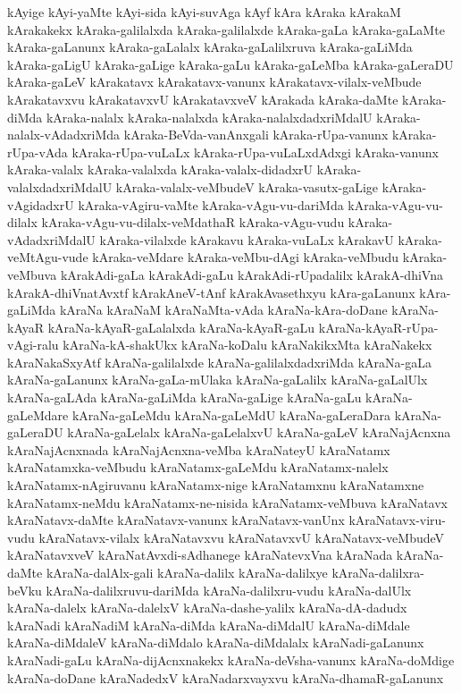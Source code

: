 {kAyige
kAyi-yaMte
kAyi-sida
kAyi-suvAga
kAyf
kAra
kAraka
kArakaM
kArakakekx
kAraka-galilalxda
kAraka-galilalxde
kAraka-gaLa
kAraka-gaLaMte
kAraka-gaLanunx
kAraka-gaLalalx
kAraka-gaLalilxruva
kAraka-gaLiMda
kAraka-gaLigU
kAraka-gaLige
kAraka-gaLu
kAraka-gaLeMba
kAraka-gaLeraDU
kAraka-gaLeV
kArakatavx
kArakatavx-vanunx
kArakatavx-vilalx-veMbude
kArakatavxvu
kArakatavxvU
kArakatavxveV
kArakada
kAraka-daMte
kAraka-diMda
kAraka-nalalx
kAraka-nalalxda
kAraka-nalalxdadxriMdalU
kAraka-nalalx-vAdadxriMda
kAraka-BeVda-vanAnxgali
kAraka-rUpa-vanunx
kAraka-rUpa-vAda
kAraka-rUpa-vuLaLx
kAraka-rUpa-vuLaLxdAdxgi
kAraka-vanunx
kAraka-valalx
kAraka-valalxda
kAraka-valalx-didadxrU
kAraka-valalxdadxriMdalU
kAraka-valalx-veMbudeV
kAraka-vasutx-gaLige
kAraka-vAgidadxrU
kAraka-vAgiru-vaMte
kAraka-vAgu-vu-dariMda
kAraka-vAgu-vu-dilalx
kAraka-vAgu-vu-dilalx-veMdathaR
kAraka-vAgu-vudu
kAraka-vAdadxriMdalU
kAraka-vilalxde
kArakavu
kAraka-vuLaLx
kArakavU
kAraka-veMtAgu-vude
kAraka-veMdare
kAraka-veMbu-dAgi
kAraka-veMbudu
kAraka-veMbuva
kArakAdi-gaLa
kArakAdi-gaLu
kArakAdi-rUpadalilx
kArakA-dhiVna
kArakA-dhiVnatAvxtf
kArakAneV-tAnf
kArakAvasethxyu
kAra-gaLanunx
kAra-gaLiMda
kAraNa
kAraNaM
kAraNaMta-vAda
kAraNa-kAra-doDane
kAraNa-kAyaR
kAraNa-kAyaR-gaLalalxda
kAraNa-kAyaR-gaLu
kAraNa-kAyaR-rUpa-vAgi-ralu
kAraNa-kA-shakUkx
kAraNa-koDalu
kAraNakikxMta
kAraNakekx
kAraNakaSxyAtf
kAraNa-galilalxde
kAraNa-galilalxdadxriMda
kAraNa-gaLa
kAraNa-gaLanunx
kAraNa-gaLa-mUlaka
kAraNa-gaLalilx
kAraNa-gaLalUlx
kAraNa-gaLAda
kAraNa-gaLiMda
kAraNa-gaLige
kAraNa-gaLu
kAraNa-gaLeMdare
kAraNa-gaLeMdu
kAraNa-gaLeMdU
kAraNa-gaLeraDara
kAraNa-gaLeraDU
kAraNa-gaLelalx
kAraNa-gaLelalxvU
kAraNa-gaLeV
kAraNajAcnxna
kAraNajAcnxnada
kAraNajAcnxna-veMba
kAraNateyU
kAraNatamx
kAraNatamxka-veMbudu
kAraNatamx-gaLeMdu
kAraNatamx-nalelx
kAraNatamx-nAgiruvanu
kAraNatamx-nige
kAraNatamxnu
kAraNatamxne
kAraNatamx-neMdu
kAraNatamx-ne-nisida
kAraNatamx-veMbuva
kAraNatavx
kAraNatavx-daMte
kAraNatavx-vanunx
kAraNatavx-vanUnx
kAraNatavx-viru-vudu
kAraNatavx-vilalx
kAraNatavxvu
kAraNatavxvU
kAraNatavx-veMbudeV
kAraNatavxveV
kAraNatAvxdi-sAdhanege
kAraNatevxVna
kAraNada
kAraNa-daMte
kAraNa-dalAlx-gali
kAraNa-dalilx
kAraNa-dalilxye
kAraNa-dalilxra-beVku
kAraNa-dalilxruvu-dariMda
kAraNa-dalilxru-vudu
kAraNa-dalUlx
kAraNa-dalelx
kAraNa-dalelxV
kAraNa-dashe-yalilx
kAraNa-dA-dadudx
kAraNadi
kAraNadiM
kAraNa-diMda
kAraNa-diMdalU
kAraNa-diMdale
kAraNa-diMdaleV
kAraNa-diMdalo
kAraNa-diMdalalx
kAraNadi-gaLanunx
kAraNadi-gaLu
kAraNa-dijAcnxnakekx
kAraNa-deVsha-vanunx
kAraNa-doMdige
kAraNa-doDane
kAraNadedxV
kAraNadarxvayxvu
kAraNa-dhamaR-gaLanunx
}
